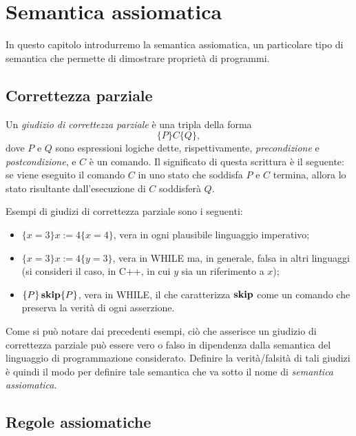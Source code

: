 \chapter{Semantica assiomatica}

In questo capitolo introdurremo la semantica assiomatica, un particolare
tipo di semantica che permette di dimostrare proprietà di programmi.

\section{Correttezza parziale}
\begin{definizione}
Un \emph{giudizio di correttezza parziale} è una tripla
della forma
\[
  \{P\} C \{Q\},
\]
dove $P$ e $Q$ sono espressioni logiche dette,
rispettivamente, \emph{precondizione} e \emph{postcondizione},
e $C$ è un comando. Il significato di questa scrittura è
il seguente: se viene eseguito il comando $C$ in uno stato che
soddisfa $P$ e $C$ termina, allora lo stato risultante dall'esecuzione di $C$
soddisferà $Q$.
\end{definizione}

Esempi di giudizi di correttezza parziale sono i seguenti:
\begin{itemize}
\item
$\{ x = 3 \} x := 4 \{ x = 4 \}$, vera in ogni plausibile linguaggio imperativo;
\item
$\{ x = 3 \} x := 4 \{ y = 3 \}$, vera in WHILE ma, in generale,
falsa in altri linguaggi (si consideri il caso, in C++, in cui $y$ sia
un riferimento a $x$);
\item
$\{ P \} \mathop{\textup{\textbf{skip}}} \{ P \}$, vera in WHILE, il che caratterizza
$\mathop{\textup{\textbf{skip}}}$ come un comando che preserva la verità di ogni asserzione.
\end{itemize}

Come si può notare dai precedenti esempi, ciò che asserisce un
giudizio di correttezza parziale può essere vero o falso
in dipendenza dalla semantica del linguaggio di programmazione
considerato.
Definire la verità/falsità di tali giudizi è quindi il modo
per definire tale semantica che va sotto il nome di
\emph{semantica assiomatica}.

\section{Regole assiomatiche} 

